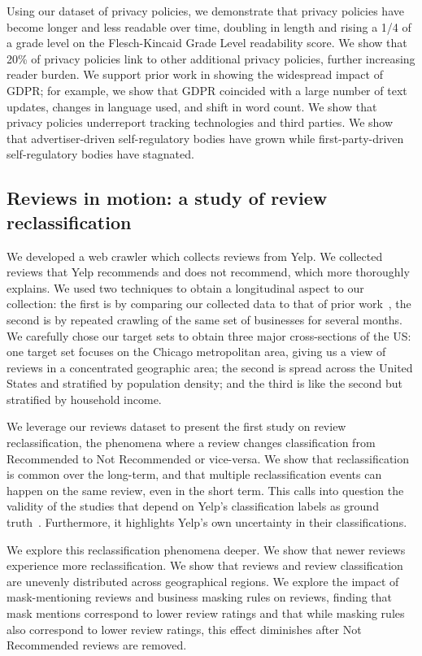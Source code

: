 Using our dataset of privacy policies, we demonstrate that privacy policies have become longer and less readable over time, doubling in length and rising a 1/4 of a grade level on the Flesch-Kincaid Grade Level readability score. We show that 20\% of privacy policies link to other additional privacy policies, further increasing reader burden. We support prior work in showing the widespread impact of GDPR; for example, we show that GDPR coincided with a large number of text updates, changes in language used, and shift in word count. We show that privacy policies underreport tracking technologies and third parties.  We show that advertiser-driven self-regulatory bodies have grown while first-party-driven self-regulatory bodies have stagnated. 

\subsection{Reviews in motion: a study of review reclassification} \label{sec:intro:reviews}
We developed a web crawler which collects reviews from Yelp. We collected reviews that Yelp recommends and does not recommend, which \citet{yelp2010recommendation} more thoroughly explains. We used two techniques to obtain a longitudinal aspect to our collection: the first is by comparing our collected data to that of prior work~\cite{mukherjee2013yelp}, the second is by repeated crawling of the same set of businesses for several months. We carefully chose our target sets to obtain three major cross-sections of the US: one target set focuses on the Chicago metropolitan area, giving us a view of reviews in a concentrated geographic area; the second is spread across the United States and stratified by population density; and the third is like the second but stratified by household income.

We leverage our reviews dataset to present the first study on review reclassification, the phenomena where a review changes classification from Recommended to Not Recommended or vice-versa. We show that reclassification is common over the long-term, and that multiple reclassification events can happen on the same review, even in the short term. This calls into question the validity of the studies that depend on Yelp's classification labels as ground truth~\cite{rayana2015collective,kc2016temporal,mukherjee2013yelp,zhu2021ifspard,shehnepoor2017netspam,yao2017automated}. Furthermore, it highlights Yelp's own uncertainty in their classifications.

We explore this reclassification phenomena deeper. We show that newer reviews experience more reclassification. We show that reviews and review classification are unevenly distributed across geographical regions. We explore the impact of mask-mentioning reviews and business masking rules on reviews, finding that mask mentions correspond to lower review ratings and that while masking rules also correspond to lower review ratings, this effect diminishes after Not Recommended reviews are removed.

